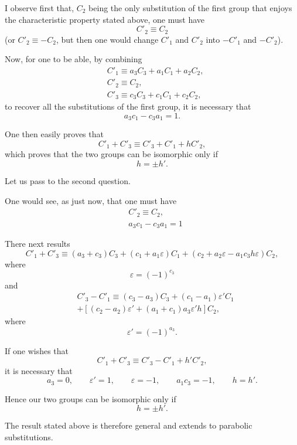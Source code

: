 \documentclass{article}
\begin{document}
I observe first that, $C_{2}$ being the only substitution of the first group that enjoys the characteristic property stated above, one must have
\[ C'_{2} \equiv C_{2} \]
(or $C'_{2} \equiv -C_{2}$, but then one would change $C'_{1}$ and $C'_{2}$ into $-C'_{1}$ and $-C'_{2}$).

Now, for one to be able, by combining
\[ \begin{aligned} &C'_{1} \equiv a_{3}C_{3} + a_{1}C_{1} + a_{2}C_{2},\\ &C'_{2} \equiv C_{2},\\ &C'_{3} \equiv c_{3}C_{3} + c_{1}C_{1} + c_{2}C_{2}, \end{aligned} \]
to recover all the substitutions of the first group, it is necessary that
\[ a_{3}c_{1} - c_{3}a_{1} = 1. \]

One then easily proves that
\[ C'_{1} + C'_{3} \equiv C'_{3} + C'_{1} + hC'_{2}, \]
which proves that the two groups can be isomorphic only if
\[ h = \pm h'. \]

Let us pass to the second question.

One would see, as just now, that one must have
\[ \begin{aligned} &C'_{2} \equiv C_{2},\\ &a_{3}c_{1} - c_{3}a_{1} = 1 \end{aligned} \]

There next results
\[ C'_{1} + C'_{3} \equiv (a_{3} + c_{3})C_{3} + (c_{1} + a_{1}\varepsilon)C_{1} + (c_{2} + a_{2}\varepsilon - a_{1}c_{3}h\varepsilon)C_{2}, \]
where
\[ \varepsilon = (-1)^{c_{3}} \]
and
\[ \begin{aligned} &C'_{3} - C'_{1} \equiv (c_{3} - a_{3})C_{3} + (c_{1} - a_{1})\varepsilon'C_{1}\\ &+ [(c_{2} - a_{2})\varepsilon' + (a_{1} + c_{1})a_{3}\varepsilon'h]C_{2}, \end{aligned} \]
where
\[ \varepsilon' = (-1)^{a_{3}}. \]

If one wishes that
\[ C'_{1} + C'_{3} \equiv C'_{3} - C'_{1} + h'C'_{2}, \] 
it is necessary that
\[ a_{3} = 0, \qquad \varepsilon' = 1, \qquad \varepsilon = -1, \qquad a_{1}c_{3} = -1, \qquad h = h'. \]

Hence our two groups can be isomorphic only if
\[ h = \pm h'. \]

The result stated above is therefore general and extends to parabolic substitutions.
\end{document}
